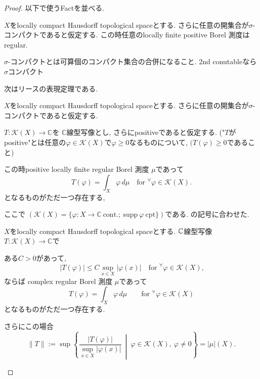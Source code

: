 \begin{proof}
以下\cite{Rud2}で使うFactを並べる. 
\begin{tcolorbox}[mybox]
\begin{thm}\cite[Theorem 2.18]{Rud2}
\label{thm-M-4.2.11}
$X$をlocally compact Hausdorff topological spaceとする. 
さらに任意の開集合が$\sigma$-コンパクトであると仮定する.
この時任意のlocally finite positive Borel 測度はregular.
\end{thm}
\end{tcolorbox}
$\sigma$-コンパクトとは可算個のコンパクト集合の合併になること. 2nd conutableなら$\sigma$コンパクト

次はリースの表現定理である. 
\begin{tcolorbox}[mybox]
\begin{thm}\cite[Theorem 2.14]{Rud2}
\label{thm-M-4.2.12}
$X$をlocally compact Hausdorff topological spaceとする. 
さらに任意の開集合が$\sigma$-コンパクトであると仮定する.

$T:\mathcal{K}(X)\to \mathbb{C}$を $\mathbb{C}$線型写像とし, さらにpositiveであると仮定する. 
 ("$T$がpositive"とは任意の$ \varphi\in \mathcal{K}(X)$で$\varphi \ge 0$なるものについて, $(T(\varphi)\geq 0 $であること)
 
この時positive locally finite regular Borel 測度 $\mu$であって
\[
T(\varphi)=\int_X \varphi \, d\mu \quad \text{for } {}^\forall \varphi\in \mathcal{K}(X).
\]
となるものがただ一つ存在する, 
\end{thm}
\end{tcolorbox}
ここで
\(
\left( \mathcal{K}(X)=\{\varphi:X\to \mathbb{C}\ \mathrm{cont.};\ \mathrm{supp}\ \varphi\ \mathrm{cpt}\}\right)
\)である. \cite{NO}の記号に合わせた. 



\begin{tcolorbox}[mybox]
\begin{thm}\cite[Theorem 6.19]{Rud2}
\label{thm-M-4.2.13}
$X$をlocally compact Hausdorff topological spaceとする. 
$\mathbb{C}$線型写像$T:\mathcal{K}(X)\to \mathbb{C}$で

ある$ C>0$があって, 
$$\ |T(\varphi)|\leq C \sup_{x\in X}|\varphi(x)| \quad \text{for } {}^\forall \varphi\in \mathcal{K}(X),
$$
ならば
complex regular Borel 測度 $\mu$であって
\[
T(\varphi)=\int_X \varphi \, d\mu \qquad \text{for } {}^\forall \varphi\in \mathcal{K}(X)
\]
となるものがただ一つ存在する. 

さらにこの場合
\[
\|T\|:=\sup\left\{\frac{|T(\varphi)|}{\sup_{x\in X}|\varphi(x)|}\ \middle|\ \varphi\in \mathcal{K}(X),\ \varphi\neq 0\right\}
=|\mu|(X).
\]


\end{thm}
\end{tcolorbox}
\end{proof}
